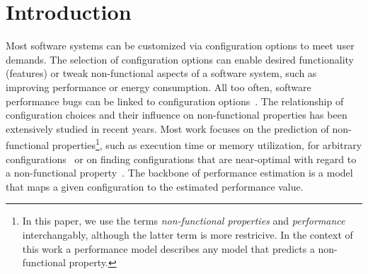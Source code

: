 \section{Introduction}
Most software systems can be customized via configuration options to meet user demands. The selection of configuration options can enable desired functionality (features) or tweak non-functional aspects of a software system, such as improving performance or energy consumption. 
All too often, software performance bugs can be linked to configuration options~\cite{han_empirical_2016}. 
The relationship of configuration choices and their influence on non-functional properties has been extensively studied in recent years. Most work focuses on the prediction of non-functional properties\footnote{In this paper, we use the terms \textit{non-functional properties} and \textit{performance} interchangably, although the latter term is more restricive. In the context of this work a performance model describes any model that predicts a non-functional property.}, such as execution time or memory utilization, for arbitrary configurations~\cite{dorn2020,siegmundPerformanceinfluenceModelsHighly2015,haDeepPerf2019,perfAL,guoVariabilityawarePerformancePrediction2013,sarkarCostEfficientSamplingPerformance,guo_2018_data,fourier_learning_2015,perLasso} or on finding configurations that are near-optimal with regard to a non-functional property~\cite{nairUsingBadLearners2017,nairFlash18,ohFindingNearoptimalConfigurations2017}. 
The backbone of performance estimation is a model that maps a given configuration to the estimated performance value. 

